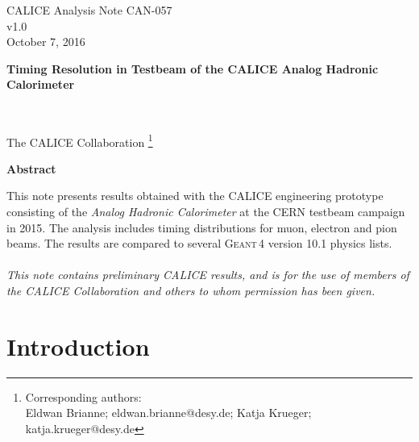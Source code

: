 \documentclass[twoside,a4paper,11pt]{article}
\newcommand\geant{\textsc{Geant\,4}\xspace}
\begin{document}
\begin{titlepage}
\begin{flushright}
CALICE Analysis Note CAN-057\\
v1.0\\
October 7, 2016 \\
\end{flushright}

\begin{center}
\vspace*{\fill}
\begin{LARGE} \textbf{Timing Resolution in Testbeam of the CALICE Analog Hadronic Calorimeter} \end{LARGE} \\ [10ex]
\begin{Large} The CALICE Collaboration \footnote{Corresponding authors: \\ Eldwan Brianne; eldwan.brianne@desy.de; Katja Krueger; katja.krueger@desy.de}\\ [10ex]
\end{Large}

\begin{large}
\textbf{Abstract} \\
\end{large}
\end{center}
This note presents results obtained with the CALICE engineering prototype consisting of the \emph{Analog Hadronic Calorimeter} at the CERN testbeam campaign in 2015. The analysis includes timing distributions for muon, electron and pion beams. The results are compared to several \geant version 10.1 physics lists.\\
\\

\textit{
This note contains preliminary CALICE results, and is for the use of members of the CALICE Collaboration and others to whom permission has been given.}

\end{titlepage}

\clearpage
\tableofcontents
\newpage
\section{Introduction}
\end{document}
